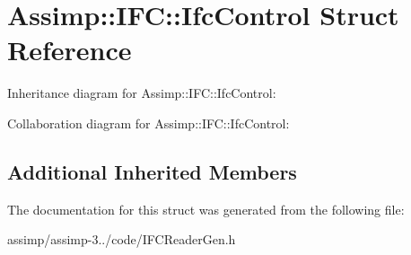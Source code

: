 \hypertarget{struct_assimp_1_1_i_f_c_1_1_ifc_control}{\section{Assimp\+:\+:I\+F\+C\+:\+:Ifc\+Control Struct Reference}
\label{struct_assimp_1_1_i_f_c_1_1_ifc_control}
}


Inheritance diagram for Assimp\+:\+:I\+F\+C\+:\+:Ifc\+Control\+:


Collaboration diagram for Assimp\+:\+:I\+F\+C\+:\+:Ifc\+Control\+:
\subsection*{Additional Inherited Members}


The documentation for this struct was generated from the following file\+:\begin{DoxyCompactItemize}
\item 
assimp/assimp-\/3../code/I\+F\+C\+Reader\+Gen.\+h\end{DoxyCompactItemize}
